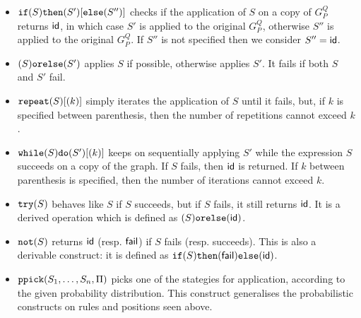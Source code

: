 \documentclass[a4paper,10pt,runningheads]{llncs}
\newcommand{\ppick}[1]{{\tt ppick(}#1{\tt )}}
\newcommand{\Id}{{\sf id}}
\newcommand{\Fail}{{\sf fail}}
\newcommand{\orelse}[2]{(#1) {\tt orelse} (#2)}
\newcommand{\whiledoo}[2]{{\tt while(}#1{\tt )do(}#2{\tt )}}
\newcommand{\repeatt}[1]{{\tt repeat(}#1{\tt )}}
\newcommand{\nott}[1]{{\tt not(}#1{\tt )}}
\newcommand{\try}[1]{{\tt try(}#1{\tt )}}
\newcommand{\ifthenelsee}[3]{{\tt if(}#1{\tt )then(}#2{\tt )else(}#3{\tt )}}
\begin{document}
\begin{itemize}
\begin{itemize}
 \item ${\tt if(}S{\tt)then(}S'{\tt )[else(}S''{\tt )]}$ checks if the
  application of $S$ on a copy of $G_P^Q$ returns $\Id$, in which case
  $S'$ is applied to the original $G_P^Q$, otherwise $S''$ is applied to the original $G_P^Q$. If $S''$ is not specified then we consider $S''=\Id$.

 \item $\orelse{S}{S'}$  applies $S$ if possible, otherwise
  applies $S'$. It fails if both $S$ and $S'$ fail. 

 \item 

$\repeatt{S}[(k)]$ simply iterates the application
   of $S$ until it fails, but, if $k$ is specified between parenthesis, then
   the number of repetitions cannot exceed $k$.


 \item $\whiledoo{S}{S'}[(k)]$ keeps on sequentially
   applying $S'$ while the expression $S$ succeeds on a copy of the
   graph.  If $S$ fails, then $\Id$ is returned. If $k$ between parenthesis
   is specified, then the number of iterations cannot exceed $k$.

 \item $\try{S}$ behaves like $S$ if $S$ succeeds, but if $S$ fails,
   it still returns $\Id$. It is a derived operation which is defined
   as $\orelse{S}{\Id}$.
  
\item $\nott{S}$ returns $\Id$ (resp. $\Fail$) if $S$ fails (resp. succeeds). This is also a derivable construct: it is defined as $\ifthenelsee{S}{\Fail}{\Id}$.

\item $\ppick{S_1, \ldots, S_n, \Pi}$
picks one of the stategies for application, according to the given
probability distribution. This 
construct generalises the probabilistic constructs on rules and 
positions seen above.

\end{itemize}

\end{itemize}

\end{document}

